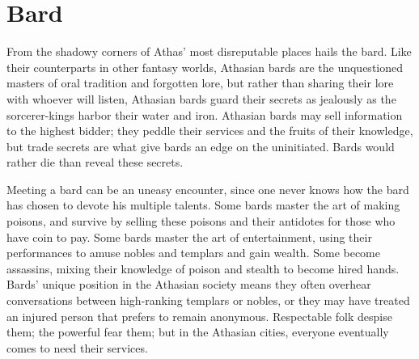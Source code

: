 \section{Bard}

From the shadowy corners of Athas' most disreputable places hails the bard. Like their counterparts in other fantasy worlds, Athasian bards are the unquestioned masters of oral tradition and forgotten lore, but rather than sharing their lore with whoever will listen, Athasian bards guard their secrets as jealously as the sorcerer-kings harbor their water and iron. Athasian bards may sell information to the highest bidder; they peddle their services and the fruits of their knowledge, but trade secrets are what give bards an edge on the uninitiated. Bards would rather die than reveal these secrets.

Meeting a bard can be an uneasy encounter, since one never knows how the bard has chosen to devote his multiple talents. Some bards master the art of making poisons, and survive by selling these poisons and their antidotes for those who have coin to pay. Some bards master the art of entertainment, using their performances to amuse nobles and templars and gain wealth. Some become assassins, mixing their knowledge of poison and stealth to become hired hands. Bards' unique position in the Athasian society means they often overhear conversations between high-ranking templars or nobles, or they may have treated an injured person that prefers to remain anonymous. Respectable folk despise them; the powerful fear them; but in the Athasian cities, everyone eventually comes to need their services.

